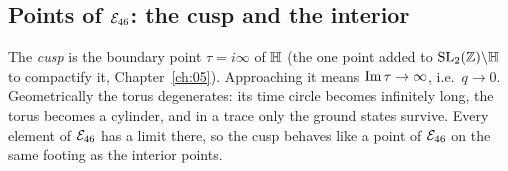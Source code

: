 \subsection{Points of \texorpdfstring{$\mathcal{E}_{46}$}{E46}: the cusp and the interior}\label{l14:sec:points}

The \emph{cusp} is the boundary point $\tau = i\infty$ of $\mathbb{H}$ (the one point added to $\mathrm{SL}_2(\mathbb{Z})\backslash\mathbb{H}$ to
compactify it, Chapter~\ref{ch:05}). Approaching it means $\operatorname{Im}\tau\to\infty$, i.e.\ $q\to0$. Geometrically the torus
degenerates: its time circle becomes infinitely long, the torus becomes a cylinder, and in a trace only the ground states survive.
Every element of $\mathcal{E}_{46}$ has a limit there, so the cusp behaves like a point of $\mathcal{E}_{46}$ on the same footing as the
interior points.

